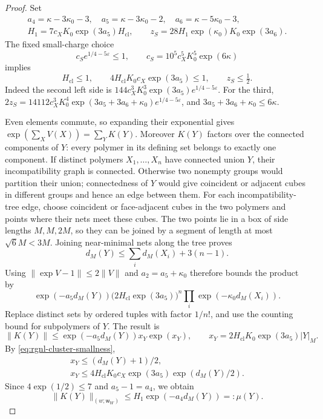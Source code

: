 \documentclass[11pt,letterpaper,reqno]{amsart}
\begin{document}
\begin{proof}
Set
\[
 \begin{gathered}
 a_4=\kappa-3\kappa_0-3,\quad
 a_5=\kappa-3\kappa_0-2,\quad
 a_6=\kappa-5\kappa_0-3,\\
 H_1=7c_XK_0\exp(3a_5)H_{\mathrm{cl}},\qquad
 z_S=28H_1\exp(\kappa_0)K_0\exp(3a_6).
 \end{gathered}
\]
The fixed small-charge choice
\[
 c_S e^{1/4-5\varepsilon}\le1,\qquad
 c_S=10^5c_X^5K_0^5\exp(6\kappa)
\]
implies
\begin{equation}\label{eq:rgnl-cluster-smallness}
 H_{\mathrm{cl}}\le1,\qquad
 4H_{\mathrm{cl}}K_0c_X\exp(3a_5)\le1,\qquad
                                      z_S\le\tfrac12.
\end{equation}
Indeed the second left side is
$144c_X^3K_0^3\exp(3a_5)e^{1/4-5\varepsilon}$.
For the third,
$2z_S=14112c_X^3K_0^4
\exp(3a_5+3a_6+\kappa_0)e^{1/4-5\varepsilon}$, and
$3a_5+3a_6+\kappa_0\le6\kappa$.

Even elements commute, so expanding their exponential
gives $\exp(\sum_XV(X))=\sum_YK(Y)$.
Moreover $K(Y)$ factors over the connected components
of $Y$: every polymer in its defining set belongs to
exactly one component.
If distinct polymers $X_1,\ldots,X_n$ have connected
union $Y$, their incompatibility graph is connected.
Otherwise two nonempty groups would partition their
union; connectedness of $Y$ would give coincident or
adjacent cubes in different groups and hence an edge
between them.
For each incompatibility-tree edge, choose coincident or
face-adjacent cubes in the two polymers and points
where their nets meet these cubes. The two points
lie in a box of side lengths $M,M,2M$, so they
can be joined by a segment of length at most
$\sqrt6M<3M$. Joining near-minimal nets along
the tree proves
\[
 d_M(Y)\le\sum_i d_M(X_i)+3(n-1).
\]
Using $\|\exp V-1\|\le2\|V\|$ and $a_2=a_5+\kappa_0$
therefore bounds the product by
\[
 \exp(-a_5d_M(Y))
       \big(2H_{\mathrm{cl}}\exp(3a_5)\big)^n
                                  \prod_i \exp(-\kappa_0d_M(X_i)).
\]
Replace distinct sets by ordered tuples with factor $1/n!$,
and use the counting bound for subpolymers of $Y$. The result is
\[
 \|K(Y)\|\le \exp(-a_5d_M(Y))x_Y\exp(x_Y),\qquad
 x_Y=2H_{\mathrm{cl}}K_0\exp(3a_5)|Y|_M.
\]
By \eqref{eq:rgnl-cluster-smallness},
\[
 \begin{gathered}
 x_Y\le(d_M(Y)+1)/2,\\
 x_Y\le4H_{\mathrm{cl}}K_0c_X\exp(3a_5)\exp(d_M(Y)/2).
 \end{gathered}
\]
Since $4\exp(1/2)\le7$ and $a_5-1=a_4$, we obtain
\begin{equation}\label{eq:rgnl-Mayer-bound}
 \|K(Y)\|_{(w;\mathsf w_W)}
                         \le H_1\exp(-a_4d_M(Y))=:\mu(Y).
\end{equation}


\end{proof}
\end{document}
